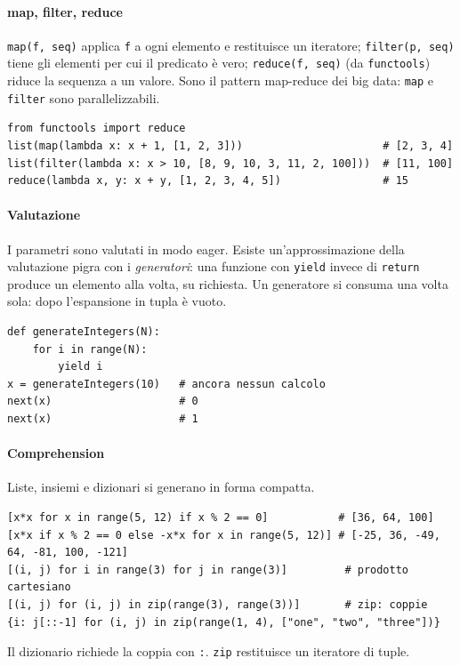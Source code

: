 \documentclass[a4paper,12pt]{article}
\begin{document}
\paragraph{map, filter, reduce} \texttt{map(f, seq)} applica \texttt{f} a ogni elemento e
restituisce un iteratore; \texttt{filter(p, seq)} tiene gli elementi per cui il predicato è
vero; \texttt{reduce(f, seq)} (da \texttt{functools}) riduce la sequenza a un valore. Sono
il pattern map-reduce dei big data: \texttt{map} e \texttt{filter} sono parallelizzabili.
\begin{verbatim}
from functools import reduce
list(map(lambda x: x + 1, [1, 2, 3]))                      # [2, 3, 4]
list(filter(lambda x: x > 10, [8, 9, 10, 3, 11, 2, 100]))  # [11, 100]
reduce(lambda x, y: x + y, [1, 2, 3, 4, 5])                # 15
\end{verbatim}

\paragraph{Valutazione} I parametri sono valutati in modo eager. Esiste un'approssimazione
della valutazione pigra con i \emph{generatori}: una funzione con \texttt{yield} invece di
\texttt{return} produce un elemento alla volta, su richiesta. Un generatore si consuma una
volta sola: dopo l'espansione in tupla è vuoto.
\begin{verbatim}
def generateIntegers(N):
    for i in range(N):
        yield i
x = generateIntegers(10)   # ancora nessun calcolo
next(x)                    # 0
next(x)                    # 1
\end{verbatim}

\paragraph{Comprehension} Liste, insiemi e dizionari si generano in forma compatta.
\begin{verbatim}
[x*x for x in range(5, 12) if x % 2 == 0]           # [36, 64, 100]
[x*x if x % 2 == 0 else -x*x for x in range(5, 12)] # [-25, 36, -49, 64, -81, 100, -121]
[(i, j) for i in range(3) for j in range(3)]         # prodotto cartesiano
[(i, j) for (i, j) in zip(range(3), range(3))]       # zip: coppie
{i: j[::-1] for (i, j) in zip(range(1, 4), ["one", "two", "three"])}
\end{verbatim}
Il dizionario richiede la coppia con \texttt{:}. \texttt{zip} restituisce un iteratore di
tuple.
\end{document}

